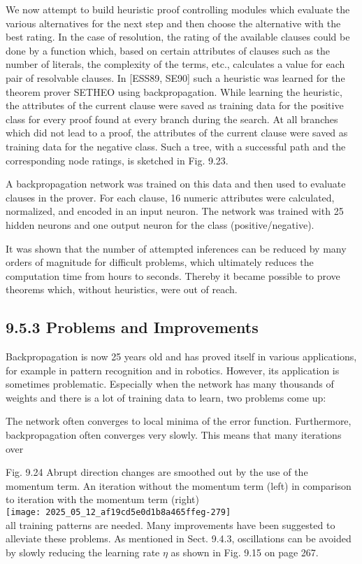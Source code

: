 \documentclass[10pt]{article}
\begin{document}
We now attempt to build heuristic proof controlling modules which evaluate the various alternatives for the next step and then choose the alternative with the best rating. In the case of resolution, the rating of the available clauses could be done by a function which, based on certain attributes of clauses such as the number of literals, the complexity of the terms, etc., calculates a value for each pair of resolvable clauses. In [ESS89, SE90] such a heuristic was learned for the theorem prover SETHEO using backpropagation. While learning the heuristic, the attributes of the current clause were saved as training data for the positive class for every proof found at every branch during the search. At all branches which did not lead to a proof, the attributes of the current clause were saved as training data for the negative class. Such a tree, with a successful path and the corresponding node ratings, is sketched in Fig. 9.23.

A backpropagation network was trained on this data and then used to evaluate clauses in the prover. For each clause, 16 numeric attributes were calculated, normalized, and encoded in an input neuron. The network was trained with 25 hidden neurons and one output neuron for the class (positive/negative).

It was shown that the number of attempted inferences can be reduced by many orders of magnitude for difficult problems, which ultimately reduces the computation time from hours to seconds. Thereby it became possible to prove theorems which, without heuristics, were out of reach.

\subsection*{9.5.3 Problems and Improvements}
Backpropagation is now 25 years old and has proved itself in various applications, for example in pattern recognition and in robotics. However, its application is sometimes problematic. Especially when the network has many thousands of weights and there is a lot of training data to learn, two problems come up:

The network often converges to local minima of the error function. Furthermore, backpropagation often converges very slowly. This means that many iterations over

Fig. 9.24 Abrupt direction changes are smoothed out by the use of the momentum term. An iteration without the momentum term (left) in comparison to iteration with the momentum term (right)\\
\texttt{[image: 2025\_05\_12\_af19cd5e0d1b8a465ffeg-279]}\\
all training patterns are needed. Many improvements have been suggested to alleviate these problems. As mentioned in Sect. 9.4.3, oscillations can be avoided by slowly reducing the learning rate $\eta$ as shown in Fig. 9.15 on page 267.
\end{document}
